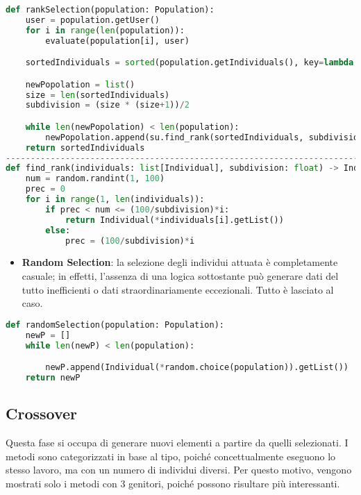 \documentclass{article}
\begin{document}
\begin{lstlisting}[language=Python]
def rankSelection(population: Population):
    user = population.getUser()
    for i in range(len(population)):
        evaluate(population[i], user)

    sortedIndividuals = sorted(population.getIndividuals(), key=lambda ind: ind.fitness())

    newPopolation = list()
    size = len(sortedIndividuals)
    subdivision = (size * (size+1))/2

    while len(newPopolation) < len(population):
        newPopolation.append(su.find_rank(sortedIndividuals, subdivision))
    return sortedIndividuals
---------------------------------------------------------------------------------------
def find_rank(individuals: list[Individual], subdivision: float) -> Individual:
    num = random.randint(1, 100)
    prec = 0
    for i in range(1, len(individuals)):
        if prec < num <= (100/subdivision)*i:
            return Individual(*individuals[i].getList())
        else:
            prec = (100/subdivision)*i
\end{lstlisting}

\pagebreak

\begin{itemize}

\item\textbf{Random Selection}: la selezione degli individui attuata è completamente casuale; in effetti, l'assenza di una logica sottostante può generare dati del tutto inefficienti o dati straordinariamente eccezionali. Tutto è lasciato al caso.

\end{itemize}

\begin{lstlisting}[language=Python]
def randomSelection(population: Population):
    newP = []
    while len(newP) < len(population):

        newP.append(Individual(*random.choice(population)).getList())
    return newP
        \end{lstlisting}

\subsection{Crossover}

Questa fase si occupa di generare nuovi elementi a partire da quelli selezionati. I metodi sono categorizzati in base al tipo, poiché concettualmente eseguono lo stesso lavoro, ma con un numero di individui diversi. Per questo motivo, vengono mostrati solo i metodi con 3 genitori, poiché possono risultare più interessanti.
\end{document}
